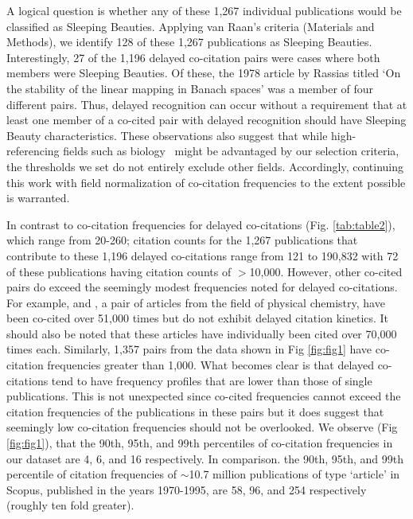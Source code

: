 \documentclass[utf8]{frontiersSCNS}
\begin{document}
A logical question is whether any of these 1,267 individual publications would be classified as Sleeping Beauties. Applying van Raan's criteria (Materials and Methods), we identify 128 of these 1,267 publications as Sleeping Beauties. Interestingly, 27 of the 1,196 delayed co-citation pairs were cases where both members were Sleeping Beauties. Of these, the 1978 article by Rassias titled `On the stability of the linear mapping in Banach spaces' was a member of four different pairs. Thus, delayed recognition can occur without a requirement that at least one member of a co-cited pair with delayed recognition should have Sleeping Beauty characteristics. These  observations also suggest that while high-referencing fields such as biology~\citep{Small1980} might be advantaged by our selection criteria, the thresholds we set do not entirely exclude other fields. Accordingly, continuing this work with field normalization of co-citation frequencies to the extent possible is warranted.

In contrast to co-citation frequencies for delayed co-citations (Fig. \ref{tab:table2}), which range from 20-260; citation counts for the 1,267 publications that contribute to these 1,196 delayed co-citations range from 121 to 190,832 with 72 of these publications having citation counts of $>$10,000. However, other co-cited pairs do exceed the seemingly modest frequencies noted for delayed co-citations. For example, \cite{becke_densityfunctional_1993} and \cite{lee_development_1988}, a pair of articles from the field of physical chemistry, have been co-cited over 51,000 times but do not exhibit delayed citation kinetics. It should also be noted that these articles have individually been cited over 70,000 times each. Similarly, 1,357 pairs from the data shown in Fig \ref{fig:fig1} have co-citation frequencies greater than 1,000. What becomes clear is that delayed co-citations tend to have frequency profiles that are lower than those of single publications. This is not unexpected since co-cited frequencies cannot exceed the citation frequencies of the publications in these pairs but it does suggest that seemingly low co-citation frequencies should not be overlooked. We observe (Fig \ref{fig:fig1}), that the 90th, 95th, and 99th percentiles of co-citation frequencies in our dataset are 4, 6, and 16 respectively. In comparison. the 90th, 95th, and 99th percentile of citation frequencies of $\sim$10.7 million publications of type `article' in Scopus, published in the years 1970-1995, are 58, 96, and 254 respectively (roughly ten fold greater).
\end{document}
